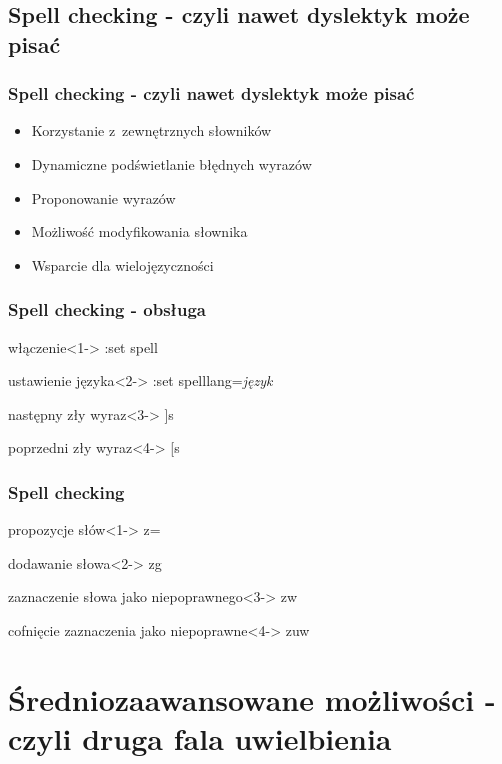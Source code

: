 \documentclass[10pt]{beamer}
\begin{document}
\subsection{Spell checking - czyli nawet dyslektyk może pisać}
\begin{frame}
	\frametitle{Spell checking - czyli nawet dyslektyk może pisać}
	\begin{itemize}[<+->]
		\item Korzystanie z~zewnętrznych słowników
		\item Dynamiczne podświetlanie błędnych wyrazów
		\item Proponowanie wyrazów
		\item Możliwość modyfikowania słownika
		\item Wsparcie dla wielojęzyczności
	\end{itemize}
\end{frame}
\begin{frame}
	\frametitle{Spell checking - obsługa}
	\begin{block}{włączenie}<1->
		:set spell
	\end{block}
	\begin{block}{ustawienie języka}<2->
		:set spelllang=\textit{język}	
	\end{block}
	\begin{block}{następny zły wyraz}<3->
		]s
	\end{block}
	\begin{block}{poprzedni zły wyraz}<4->
		[s
	\end{block}
\end{frame}
\begin{frame}
	\frametitle{Spell checking}
	\begin{block}{propozycje słów}<1->
		z=
	\end{block}
	\begin{block}{dodawanie słowa}<2->
		zg
	\end{block}
	\begin{block}{zaznaczenie słowa jako niepoprawnego}<3->
		zw
	\end{block}
	\begin{block}{cofnięcie zaznaczenia jako niepoprawne}<4->
		zuw
	\end{block}
\end{frame}
\section{Średniozaawansowane możliwości - czyli druga fala uwielbienia}
\end{document}
